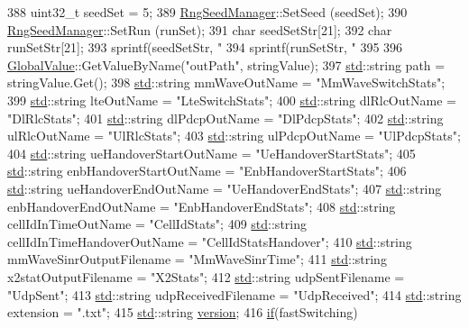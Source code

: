 \begin{DoxyCode}
388   uint32\_t seedSet = 5;
389   \hyperlink{classns3_1_1RngSeedManager}{RngSeedManager}::SetSeed (seedSet);
390   \hyperlink{classns3_1_1RngSeedManager}{RngSeedManager}::SetRun (runSet); 
391   \textcolor{keywordtype}{char} seedSetStr[21];
392   \textcolor{keywordtype}{char} runSetStr[21];
393   sprintf(seedSetStr, "%
394   sprintf(runSetStr, "%
395 
396   \hyperlink{classns3_1_1GlobalValue}{GlobalValue}::GetValueByName("outPath", stringValue);
397   \hyperlink{namespacestd}{std}::\textcolor{keywordtype}{string} path = stringValue.Get();
398   \hyperlink{namespacestd}{std}::\textcolor{keywordtype}{string} mmWaveOutName = "MmWaveSwitchStats";
399   \hyperlink{namespacestd}{std}::\textcolor{keywordtype}{string} lteOutName = "LteSwitchStats";
400   \hyperlink{namespacestd}{std}::\textcolor{keywordtype}{string} dlRlcOutName = "DlRlcStats";
401   \hyperlink{namespacestd}{std}::\textcolor{keywordtype}{string} dlPdcpOutName = "DlPdcpStats";
402   \hyperlink{namespacestd}{std}::\textcolor{keywordtype}{string} ulRlcOutName = "UlRlcStats";
403   \hyperlink{namespacestd}{std}::\textcolor{keywordtype}{string} ulPdcpOutName = "UlPdcpStats";
404   \hyperlink{namespacestd}{std}::\textcolor{keywordtype}{string}  ueHandoverStartOutName =  "UeHandoverStartStats";
405   \hyperlink{namespacestd}{std}::\textcolor{keywordtype}{string} enbHandoverStartOutName = "EnbHandoverStartStats";
406   \hyperlink{namespacestd}{std}::\textcolor{keywordtype}{string}  ueHandoverEndOutName =  "UeHandoverEndStats";
407   \hyperlink{namespacestd}{std}::\textcolor{keywordtype}{string} enbHandoverEndOutName = "EnbHandoverEndStats";
408   \hyperlink{namespacestd}{std}::\textcolor{keywordtype}{string} cellIdInTimeOutName = "CellIdStats";
409   \hyperlink{namespacestd}{std}::\textcolor{keywordtype}{string} cellIdInTimeHandoverOutName = "CellIdStatsHandover";
410   \hyperlink{namespacestd}{std}::\textcolor{keywordtype}{string} mmWaveSinrOutputFilename = "MmWaveSinrTime";
411   \hyperlink{namespacestd}{std}::\textcolor{keywordtype}{string} x2statOutputFilename = "X2Stats";
412   \hyperlink{namespacestd}{std}::\textcolor{keywordtype}{string} udpSentFilename = "UdpSent";
413   \hyperlink{namespacestd}{std}::\textcolor{keywordtype}{string} udpReceivedFilename = "UdpReceived";
414   \hyperlink{namespacestd}{std}::\textcolor{keywordtype}{string} extension = ".txt";
415   \hyperlink{namespacestd}{std}::\textcolor{keywordtype}{string} \hyperlink{namespaceconf_a93370314d5e59e93dabf67ca4906c634}{version};
416   \hyperlink{loss__ITU1238_8m_a419d895abe1313c35fa353c93802647e}{if}(fastSwitching)

\end{DoxyCode}
